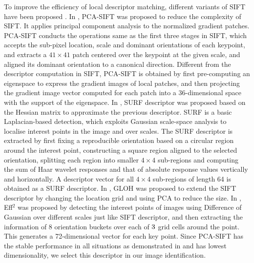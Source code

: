 \documentclass[runningheads,a4paper]{llncs}
\begin{document}
To improve the efficiency of local descriptor matching, different variants of SIFT have been proposed \cite{1315206,bay2006surf,10.1109/TPAMI.2005.188,DBLP:conf/mm/LejsekAJA06a}. In \cite{1315206}, PCA-SIFT was proposed to reduce the complexity of SIFT. It applies principal component analysis to the normalized gradient patches. PCA-SIFT conducts the operations same as the first three stages in SIFT, which accepts the sub-pixel location, scale and dominant orientations of each keypoint, and extracts a $41\times 41$ patch centered over the keypoint at the given scale, and aligned its dominant orientation to a canonical direction. Different from the descriptor computation in SIFT, PCA-SIFT is obtained by first pre-computing an eigenspace to express the gradient images of local patches, and then projecting the gradient image vector computed for each patch into a 36-dimensional space with the support of the eigenspace. In \cite{bay2006surf}, SURF descriptor was proposed based on the Hessian matrix to approximate the previous descriptor. SURF is a basic Laplacian-based detection, which exploits Gaussian scale-space analysis to localise interest points in the image and over scales. The SURF descriptor is extracted by first fixing a reproducible orientation based on a circular region around the interest point, constructing a square region aligned to the selected orientation, splitting each region into smaller $4\times 4$ sub-regions and computing the sum of Haar wavelet responses and that of absolute response values vertically and horizontally. A descriptor vector for all $4\times4$ sub-regions of length 64 is obtained as a SURF descriptor. In \cite{10.1109/TPAMI.2005.188}, GLOH was proposed to extend the SIFT descriptor by changing the location grid and using PCA to reduce the size. In \cite{DBLP:conf/mm/LejsekAJA06a}, Eff$^2$ was proposed by detecting the interest points of images using Difference of Gaussian over different scales just like SIFT descriptor, and then extracting the information of 8 orientation buckets over each of $3\time 3$ grid cells around the point. This generates a 72-dimensional vector for each key point. Since PCA-SIFT has the stable performance in all situations as demonstrated in \cite{juan2009comparison} and has lowest dimensionality, we select this descriptor in our image identification.
\end{document}
